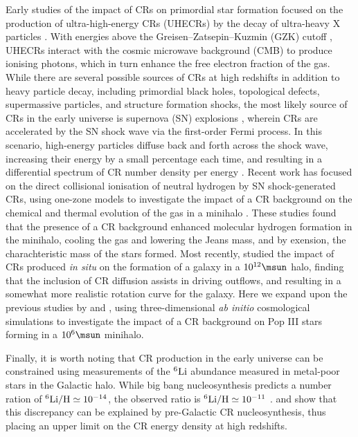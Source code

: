 Early studies of the impact of CRs on primordial star formation focused on the production of ultra-high-energy CRs (UHECRs) by the decay of ultra-heavy X particles \citep{ShchekinovVasiliev2004,VasilievShchekinov2006,RipamontiMapelliFerrara2007}.  With energies above the Greisen--Zatsepin--Kuzmin (GZK) cutoff \citep{Greisen1966,ZatsepinKuzmin1966}, UHECRs interact with the cosmic microwave background (CMB) to produce ionising photons, which in turn enhance the free electron fraction of the gas.  
While there are several possible sources of CRs at high redshifts in addition to heavy particle decay, including primordial black holes, topological defects, supermassive particles, and structure formation shocks, the most likely source of CRs in the early universe is supernova (SN) explosions \citep[e.g.,][]{GinzburgSyrovatskii1969,BiermannSigl2001,Stanev2004,Pfrommeretal2006}, wherein CRs are accelerated by the SN shock wave via the first-order Fermi process.  In this scenario, high-energy particles diffuse back and forth across the shock wave, increasing their energy by a small percentage each time, and resulting in a differential spectrum of CR number density per energy \citep{Longair1994}.
Recent work has focused on the direct collisional ionisation of neutral hydrogen by SN shock-generated CRs, using one-zone models to investigate the impact of a CR background on the chemical and thermal evolution of the gas in a minihalo \citep{StacyBromm2007,JascheCiardiEnsslin2007}.  These studies found that the presence of a CR background enhanced molecular hydrogen formation in the minihalo, cooling the gas and lowering the Jeans mass, and by exension, the charachteristic mass of the stars formed. Most recently, \citet{SalemBryanHummels2014} studied the impact of CRs produced \textit{in situ} on the formation of a galaxy in a $10^{12}\msun$ halo, finding that the inclusion of CR diffusion assists in driving outflows, and resulting in a somewhat more realistic rotation curve for the galaxy.  Here we expand upon the previous studies by \citet{StacyBromm2007} and \citet{JascheCiardiEnsslin2007}, using three-dimensional \textit{ab initio} cosmological simulations to investigate the impact of a CR background on Pop III stars forming in a $10^6\msun$ minihalo.

Finally, it is worth noting that CR production in the early universe can be constrained using measurements of the $^6{\rm Li}$ abundance measured in metal-poor stars in the Galactic halo.  While big bang nucleosynthesis  predicts a number ration of $^6{\rm Li/H} \simeq 10^{-14}$, the observed  ratio is   $^6{\rm Li/H} \simeq 10^{-11}$ \citep{Asplundetal2006}. \citet{RollindeVangioniOlive2005} and \citet{RollindeVangioniOlive2006} show that this discrepancy can be explained by pre-Galactic CR nucleosynthesis, thus placing an upper limit on the CR energy density at high redshifts.


